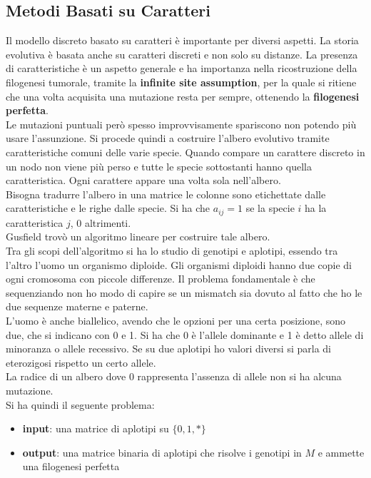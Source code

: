 \documentclass[a4paper,12pt, oneside]{book}
\begin{document}
\subsection{Metodi Basati su Caratteri}
Il modello discreto basato su caratteri è importante per diversi aspetti.
La storia evolutiva è basata anche su caratteri discreti e non solo su distanze.
La presenza di caratteristiche è un aspetto generale e ha importanza nella
ricostruzione della filogenesi tumorale, tramite la \textbf{infinite site
  assumption}, per la quale si ritiene che una volta acquisita una mutazione
resta per sempre, ottenendo la \textbf{filogenesi perfetta}. \\
Le mutazioni puntuali però spesso improvvisamente spariscono
non potendo più usare l'assunzione. Si procede quindi a costruire l'albero
evolutivo tramite caratteristiche comuni delle varie specie. Quando compare
un carattere discreto in un nodo non viene più perso e tutte le specie
sottostanti hanno quella caratteristica. Ogni carattere appare una volta sola
nell'albero. \\
Bisogna tradurre l'albero in una matrice le colonne sono etichettate dalle
caratteristiche e le righe dalle specie. Si ha che $a_{ij}=1$ se la specie $i$
ha la caratteristica $j$, 0 altrimenti.\\
Gusfield trovò un algoritmo lineare per costruire tale albero.\\
Tra gli scopi dell'algoritmo si ha lo studio di genotipi e aplotipi, essendo
tra l'altro l'uomo un organismo diploide. Gli organismi diploidi hanno due copie
di ogni cromosoma con piccole differenze. Il problema fondamentale è che
sequenziando non ho modo di capire se un mismatch sia dovuto al fatto che
ho le due sequenze materne e paterne.
\\
L'uomo è anche biallelico, avendo che le opzioni per una certa posizione, sono
due, che si indicano con 0 e 1. Si ha che 0 è l'allele dominante e 1 è detto
allele di minoranza o allele recessivo. Se su due aplotipi ho valori diversi
si parla di eterozigosi rispetto un certo allele.\\
La radice di un albero dove 0 rappresenta l'assenza di allele non si ha alcuna
mutazione.\\
Si ha quindi il seguente problema:
\begin{itemize}
\item \textbf{input}: una matrice di aplotipi su $\{0,1,*\}$
\item \textbf{output}: una matrice binaria di aplotipi che risolve i genotipi
  in $M$ e ammette una filogenesi perfetta
\end{itemize}
\end{document}
